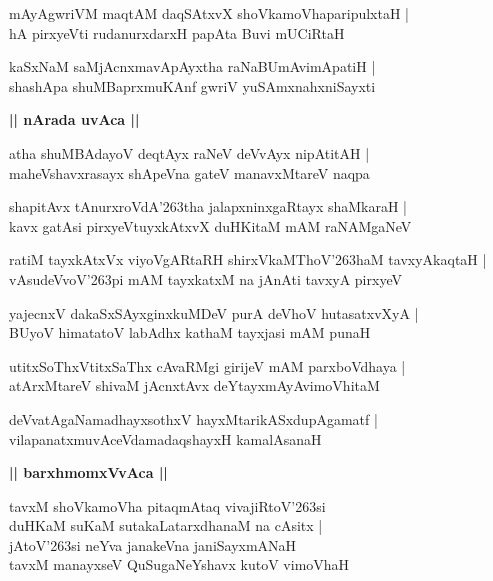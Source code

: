 \documentclass[twoside,12pt,openright]{book}
\def\S{\char'263}
\newcounter{shloka}[chapter]
\def\uvaca#1{\centerline{{\large\textbf{#1}}}}
\begin{document}
\begin{shloka}%
mAyAgwriVM maqtAM daqSAtxvX shoVkamoVhaparipulxtaH |\\
hA pirxyeVti rudanurxdarxH papAta Buvi mUCiRtaH
\end{shloka}

\begin{shloka}%
kaSxNaM saMjAcnxmavApAyxtha raNaBUmAvimApatiH |\\
shashApa shuMBaprxmuKAnf gwriV yuSAmxnahxniSayxti
\end{shloka}

\uvaca{|| nArada uvAca ||}

\begin{shloka}%
atha shuMBAdayoV deqtAyx raNeV deVvAyx nipAtitAH |\\
maheVshavxrasayx shApeVna gateV manavxMtareV naqpa 
\end{shloka}

\begin{shloka}%
shapitAvx tAnurxroVdA\S tha jalapxninxgaRtayx shaMkaraH |\\
kavx gatAsi pirxyeVtuyxkAtxvX duHKitaM mAM raNAMgaNeV 
\end{shloka}

\begin{shloka}%
ratiM tayxkAtxVx viyoVgARtaRH shirxVkaMThoV\S haM tavxyAkaqtaH |\\
vAsudeVvoV\S pi mAM tayxkatxM na jAnAti tavxyA pirxyeV 
\end{shloka}

\begin{shloka}%
yajecnxV dakaSxSAyxginxkuMDeV purA deVhoV hutasatxvXyA |\\
BUyoV himatatoV labAdhx kathaM tayxjasi mAM punaH 
\end{shloka}

\begin{shloka}%
utitxSoThxVtitxSaThx cAvaRMgi girijeV mAM parxboVdhaya |\\
atArxMtareV shivaM jAcnxtAvx deYtayxmAyAvimoVhitaM 
\end{shloka}

\begin{shloka}%
deVvatAgaNamadhayxsothxV hayxMtarikASxdupAgamatf |\\
vilapanatxmuvAceVdamadaqshayxH kamalAsanaH 
\end{shloka}

\uvaca{|| barxhmomxVvAca ||}

\begin{shloka}%
tavxM shoVkamoVha pitaqmAtaq vivajiRtoV\S si \\
duHKaM suKaM sutakaLatarxdhanaM na cAsitx |\\
jAtoV\S si neYva janakeVna janiSayxmANaH \\
tavxM manayxseV QuSugaNeYshavx kutoV vimoVhaH
\end{shloka}
\end{document}
